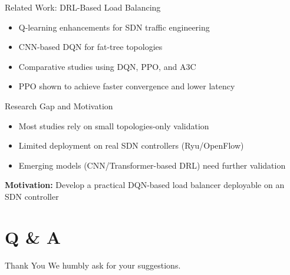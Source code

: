 \documentclass[aspectratio=169]{beamer}
\begin{document}
\begin{frame}{Related Work: DRL-Based Load Balancing}
\begin{itemize}
    \item Q-learning enhancements for SDN traffic engineering
    \item CNN-based DQN for fat-tree topologies
    \item Comparative studies using DQN, PPO, and A3C
    \item PPO shown to achieve faster convergence and lower latency
\end{itemize}
\end{frame}

\begin{frame}{Research Gap and Motivation}
\begin{itemize}
    \item Most studies rely on small topologies-only validation
    \item Limited deployment on real SDN controllers (Ryu/OpenFlow)
    \item Emerging models (CNN/Transformer-based DRL) need further validation
\end{itemize}

\vspace{0.5em}
\textbf{Motivation:} Develop a practical DQN-based load balancer deployable on an SDN controller
\end{frame}





% 

\section*{Q \& A}
\begin{frame}{Thank You}
  \centering
  \Large We humbly ask for your suggestions.
\end{frame}
\end{document}
